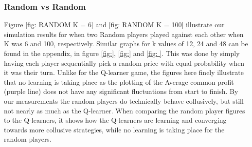 \documentclass{article}
\begin{document}
\subsubsection{Random vs Random}
Figure \ref{fig: RANDOM K = 6} and \ref{fig: RANDOM K = 100} illustrate our simulation results for when two Random players played against each other when K was 6 and 100, respectively. Similar graphs for k values of 12, 24 and 48 can be found in the appendix, in figure \ref{fig:}, \ref{fig:} and \ref{fig: }. This was done by simply having each player sequentially pick a random price with equal probability when it was their turn. Unlike for the Q-learner game, the figures here finely illustrate that no learning is taking place as the plotting of the Average common profit (purple line) does not have any significant fluctuations from start to finish. By our measurements the random players do technically behave collusively, but still not nearly as much as the Q-learner. When comparing the random player figures to the Q-learners, it shows how the Q-learners are learning and converging towards more collusive strategies, while no learning is taking place for the random players.   
\end{document}
